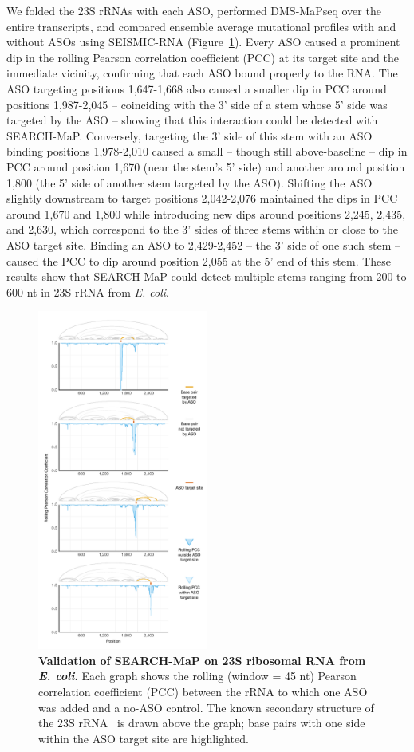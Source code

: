 \documentclass[main.tex]{subfiles}
\begin{document}
We folded the 23S rRNAs with each ASO, performed DMS-MaPseq over the entire transcripts, and compared ensemble average mutational profiles with and without ASOs using SEISMIC-RNA (Figure~\ref{rrna}).
Every ASO caused a prominent dip in the rolling Pearson correlation coefficient (PCC) at its target site and the immediate vicinity, confirming that each ASO bound properly to the RNA.
The ASO targeting positions 1,647-1,668 also caused a smaller dip in PCC around positions 1,987-2,045 -- coinciding with the 3' side of a stem whose 5' side was targeted by the ASO -- showing that this interaction could be detected with SEARCH-MaP.
Conversely, targeting the 3' side of this stem with an ASO binding positions 1,978-2,010 caused a small -- though still above-baseline -- dip in PCC around position 1,670 (near the stem's 5' side) and another around position 1,800 (the 5' side of another stem targeted by the ASO).
Shifting the ASO slightly downstream to target positions 2,042-2,076 maintained the dips in PCC around 1,670 and 1,800 while introducing new dips around positions 2,245, 2,435, and 2,630, which correspond to the 3' sides of three stems within or close to the ASO target site.
Binding an ASO to 2,429-2,452 -- the 3' side of one such stem -- caused the PCC to dip around position 2,055 at the 5' end of this stem.
These results show that SEARCH-MaP could detect multiple stems ranging from 200 to 600 nt in 23S rRNA from \textit{E. coli}.

\begin{figure}[H]
	\includegraphics[width=0.5\textwidth]{../MainFigures/rrna/rrna.pdf}
	\caption{\textbf{Validation of SEARCH-MaP on 23S ribosomal RNA from \textit{E. coli}.} Each graph shows the rolling (window = 45 nt) Pearson correlation coefficient (PCC) between the rRNA to which one ASO was added and a no-ASO control. The known secondary structure of the 23S rRNA~\cite{Cannone2002} is drawn above the graph; base pairs with one side within the ASO target site are highlighted.}
	\label{rrna}
\end{figure}
\end{document}
